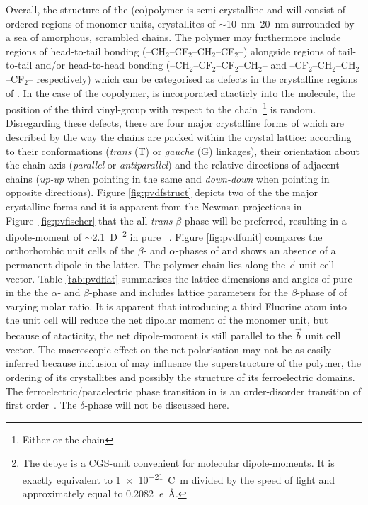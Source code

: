 Overall, the structure of the (co)polymer is semi-crystalline and will consist of ordered regions of monomer units, crystallites of $\sim$\SIrange{10}{20}{\nano\metre} surrounded by a sea of amorphous, scrambled chains. The polymer may furthermore include regions of head-to-tail bonding (--CH$_2$--CF$_2$--CH$_2$--CF$_2$--) alongside regions of tail-to-tail and/or head-to-head bonding (--CH$_2$--CF$_2$--CF$_2$--CH$_2$-- and --CF$_2$--CH$_2$--CH$_2$--CF$_2$-- respectively) which can be categorised as defects in the crystalline regions of \pvdf{}. In the case of the copolymer, \trfe{} is incorporated atacticly into the molecule, \ie{} the position of the third vinyl-group with respect to the chain~\footnote{Either  or  the chain} is random. Disregarding these defects, there are four major crystalline forms of \pvdf{} which are described by the way the chains are packed within the crystal lattice: according to their conformations (\emph{trans} (T) or \emph{gauche} (G) linkages), their orientation about the chain axis (\emph{parallel} or \emph{antiparallel}) and the relative directions of adjacent chains (\emph{up-up} when pointing in the same and \emph{down-down} when pointing in opposite directions). Figure \ref{fig:pvdfstruct} depicts two of the the major crystalline forms and it is apparent from the Newman-projections in Figure~\ref{fig:pvfischer} that the all-\emph{trans} $\beta$-phase will be preferred, resulting in a dipole-moment of $\sim$\SI{2.1}{D}~\footnote{The debye is a CGS-unit convenient for molecular dipole-moments. It is exactly equivalent to \SI{1e-21}{\coulomb\metre} divided by the speed of light and  approximately equal to \SI{0.2082}{\elementarycharge\angstrom}.} in pure \pvdf{}~\cite[p. 810]{encyclopedia}. Figure \ref{fig:pvdfunit} compares the orthorhombic unit cells of the $\beta$- and $\alpha$-phases of \pvdf{} and shows an absence of a permanent dipole in the latter. The polymer chain lies along the $\vec{c}$ unit cell vector. Table \ref{tab:pvdflat} summarises the lattice dimensions and angles of pure \pvdf{} in the the $\alpha$- and $\beta$-phase and includes lattice parameters for the $\beta$-phase of \pvfe{} of varying molar ratio. It is apparent that introducing a third Fluorine atom into the unit cell will reduce the net dipolar moment of the monomer unit, but because of atacticity, the net dipole-moment is still parallel to the $\vec{b}$ unit cell vector. The macroscopic effect on the net polarisation may not be as easily inferred because inclusion of \trfe{} may influence the superstructure of the polymer, the ordering of its crystallites and possibly the structure of its ferroelectric domains. The ferroelectric/paraelectric phase transition in \pvdf{} is an order-disorder transition of first order~\cite{takeo}. The $\delta$-phase will not be discussed here.
